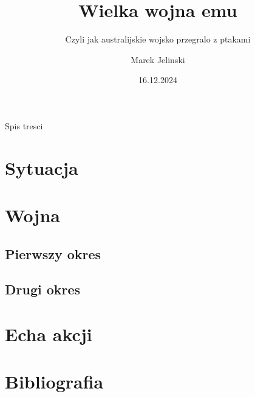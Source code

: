 \documentclass{beamer}
\title{Wielka wojna emu}
\subtitle{Czyli jak australijskie wojsko przegralo z ptakami}
\author{Marek Jelinski}
\date{16.12.2024}
\begin{document}
\begin{frame}
    \titlepage
\end{frame}

\begin{frame}{Spis tresci}
    \tableofcontents
\end{frame}

\section{Sytuacja}
\section{Wojna}
    \subsection{Pierwszy okres}
    \subsection{Drugi okres}    
\section{Echa akcji}
\section{Bibliografia}
\end{document}
